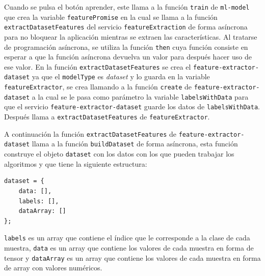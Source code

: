 \documentclass[a4paper, 12pt]{book}
\begin{document}
Cuando se pulsa el botón aprender, este llama a la función \texttt{train} de \texttt{ml-model} que crea la variable \texttt{featurePromise} en la cual se llama a la función \texttt{extractDatasetFeatures} del servicio \texttt{featureExtraction} de forma asíncrona para no bloquear la aplicación mientras se extraen las características. Al tratarse de programación asíncrona, se utiliza la función \texttt{then} cuya función consiste en esperar a que la función asíncrona devuelva un valor para después hacer uso de ese valor. En la función \texttt{extractDatasetFeatures} se crea el \texttt{feature-extractor-dataset} ya que el \texttt{modelType} es \emph{dataset} y lo guarda en la variable \texttt{featureExtractor}, se crea llamando a la función \texttt{create} de \texttt{feature-extractor-dataset} a la cual se le pasa como parámetro la variable \texttt{labelsWithData} para que el servicio \texttt{feature-extractor-dataset} guarde los datos de \texttt{labelsWithData}. Después llama a \texttt{extractDatasetFeatures} de \texttt{featureExtractor}.

A continuación la función \texttt{extractDatasetFeatures} de \texttt{feature-extractor-dataset} llama a la función \texttt{buildDataset} de forma asíncrona, esta función construye el objeto \texttt{dataset} con los datos con los que pueden trabajar los algoritmos y que tiene la siguiente estructura:
\begin{verbatim}
dataset = {
    data: [],
    labels: [],
    dataArray: []
};
\end{verbatim}

\texttt{labels} es un array que contiene el índice que le corresponde a la clase de cada muestra, \texttt{data} es un array que contiene los valores de cada muestra en forma de tensor y \texttt{dataArray} es un array que contiene los valores de cada muestra en forma de array con valores numéricos.
\end{document}

